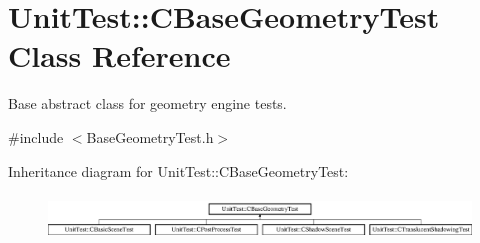 \hypertarget{class_unit_test_1_1_c_base_geometry_test}{}\section{Unit\+Test\+::C\+Base\+Geometry\+Test Class Reference}
\label{class_unit_test_1_1_c_base_geometry_test}


Base abstract class for geometry engine tests.  




{\ttfamily \#include $<$Base\+Geometry\+Test.\+h$>$}

Inheritance diagram for Unit\+Test\+::C\+Base\+Geometry\+Test\+:\begin{figure}[H]
\begin{center}
\leavevmode
\includegraphics[height=1.217391cm]{class_unit_test_1_1_c_base_geometry_test}
\end{center}
\end{figure}
